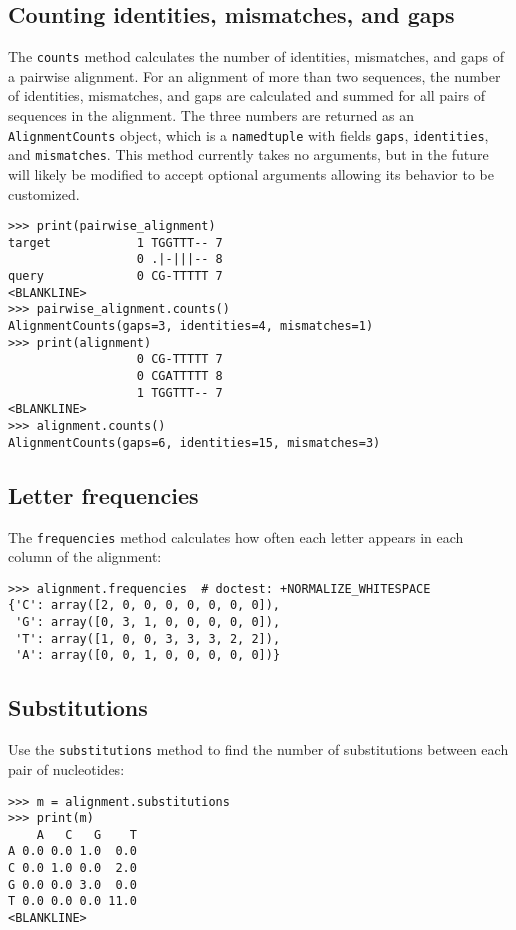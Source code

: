 \subsection{Counting identities, mismatches, and gaps}

The \verb|counts| method calculates the number of identities, mismatches, and gaps of a pairwise alignment.
For an alignment of more than two sequences, the number of identities, mismatches, and gaps are calculated and summed for all pairs of sequences in the alignment. The three numbers are returned as an \verb|AlignmentCounts| object, which is a \verb|namedtuple| with fields \verb|gaps|, \verb|identities|, and \verb|mismatches|. This method currently takes no arguments, but in the future will likely be modified to accept optional arguments allowing its behavior to be customized.
\begin{verbatim}
>>> print(pairwise_alignment)
target            1 TGGTTT-- 7
                  0 .|-|||-- 8
query             0 CG-TTTTT 7
<BLANKLINE>
>>> pairwise_alignment.counts()
AlignmentCounts(gaps=3, identities=4, mismatches=1)
>>> print(alignment)
                  0 CG-TTTTT 7
                  0 CGATTTTT 8
                  1 TGGTTT-- 7
<BLANKLINE>
>>> alignment.counts()
AlignmentCounts(gaps=6, identities=15, mismatches=3)
\end{verbatim}

\subsection{Letter frequencies}

The \verb+frequencies+ method calculates how often each letter appears in each column of the alignment:
\begin{verbatim}
>>> alignment.frequencies  # doctest: +NORMALIZE_WHITESPACE
{'C': array([2, 0, 0, 0, 0, 0, 0, 0]),
 'G': array([0, 3, 1, 0, 0, 0, 0, 0]),
 'T': array([1, 0, 0, 3, 3, 3, 2, 2]),
 'A': array([0, 0, 1, 0, 0, 0, 0, 0])}
\end{verbatim}

\subsection{Substitutions}

Use the \verb+substitutions+ method to find the number of substitutions between each pair of nucleotides:
\begin{verbatim}
>>> m = alignment.substitutions
>>> print(m)
    A   C   G    T
A 0.0 0.0 1.0  0.0
C 0.0 1.0 0.0  2.0
G 0.0 0.0 3.0  0.0
T 0.0 0.0 0.0 11.0
<BLANKLINE>
\end{verbatim}

